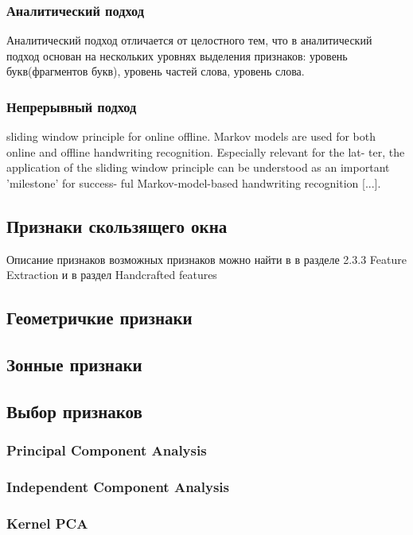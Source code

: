 \subsubsection{Аналитический подход}

Аналитический подход отличается от целостного тем, что в аналитический подход основан на нескольких уровнях выделения признаков: уровень букв(фрагментов букв), уровень частей слова, уровень слова.

\subsubsection{Непрерывный подход}

sliding window principle for online offline. Markov models are used for both online and offline handwriting recognition. Especially relevant for the lat- ter, the application of the sliding window principle can be understood as an important ’milestone’ for success- ful Markov-model-based handwriting recognition [...].\cite{plotz2009markov}

\subsection{Признаки скользящего окна}

Описание признаков возможных признаков можно найти в \cite{vinciarelli2003offline} в разделе 2.3.3 Feature Extraction и в \cite{tay2002offline} раздел Handcrafted features

\subsection{Геометричкие признаки}
\subsection{Зонные признаки}
\subsection{Выбор признаков}
\subsubsection{Principal Component Analysis}
\subsubsection{Independent Component Analysis}
\subsubsection{Kernel PCA}

